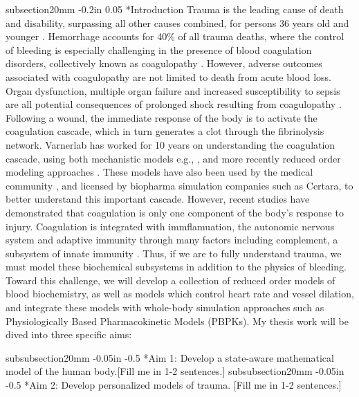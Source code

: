 \documentclass[12pt]{article}
\makeatletter
\renewcommand\subsubsection{\@startsection
	{subsubsection}{2}{0mm}
	{-0.05in}
	{-0.5\baselineskip}
	{\normalfont\normalsize\bfseries}}
\renewcommand\section{\@startsection
	{subsection}{2}{0mm}
	{-0.2in}
	{0.05\baselineskip}
	{\normalfont\large\bfseries}}
\makeatother
\begin{document}
\section*{Introduction}
Trauma is the leading cause of death and disability, surpassing all other causes combined, for persons 36 years old and younger \cite{Krug:2000aa}.
Hemorrhage accounts for 40\% of all trauma deaths, where the control of bleeding is especially challenging in the presence of blood coagulation disorders, collectively known as coagulopathy \cite{Sauaia:1995aa}. However, adverse outcomes associated with coagulopathy are not limited to death from acute blood loss.
Organ dysfunction, multiple organ failure and increased susceptibility to sepsis \cite{Esmon:2005aa}
are all potential consequences of prolonged shock resulting from coagulopathy \cite{Sauaia:1994aa}.
Following a wound, the immediate response of the body is to activate the coagulation cascade, which in turn generates a clot through the fibrinolysis network.
Varnerlab has worked for 10 years on understanding the coagulation cascade,
using both mechanistic models e.g., \cite{Luan:2007aa,Luan:2010aa}, and more recently reduced order modeling approaches \cite{pr3010178}.
These models have also been used by the medical community \cite{Szlam:2010aa,Rice:2016aa}, and licensed by  biopharma simulation companies such as Certara, to better understand this important cascade. However, recent studies have demonstrated that coagulation is only one component of the body's response to injury.
Coagulation is integrated with immflamuation, the autonomic nervous system and adaptive immunity through many factors including complement, a subsystem of innate immunity \cite{Rittirsch:2008aa}. Thus, if we are to fully understand trauma, we must model these biochemical subsystems in addition to the physics of bleeding.
Toward this challenge, we will develop a collection of reduced order models of blood biochemistry,
as well as models which control heart rate and vessel dilation, and integrate these models with whole-body simulation approaches such as Physiologically Based Pharmacokinetic Models (PBPKs).
My thesis work will be dived into three specific aims:

\subsubsection*{Aim 1: Develop a state-aware mathematical model of the human body.}[Fill me in 1-2 sentences.]
\subsubsection*{Aim 2: Develop personalized models of trauma. }[Fill me in 1-2 sentences.]
\end{document}
